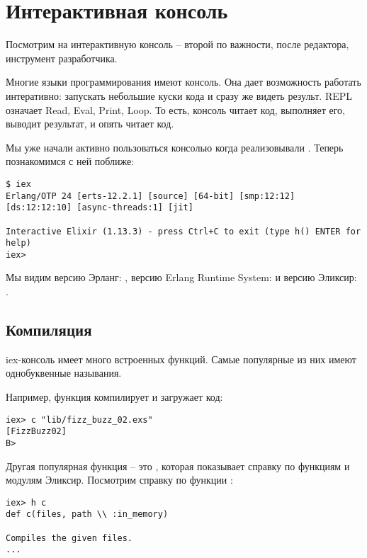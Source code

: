 \chapter{Интерактивная консоль}

Посмотрим на интерактивную консоль  -- второй по важности, после редактора, инструмент разработчика.

Многие языки программирования имеют  консоль. Она дает возможность работать интеративно: запускать небольшие куски кода и сразу же видеть результ. REPL означает Read, Eval, Print, Loop. То есть, консоль читает код, выполняет его, выводит результат, и опять читает код.

Мы уже начали активно пользоваться консолью когда реализовывали . Теперь познакомимся с ней поближе:

\begin{lstlisting}[caption=Запуск консоли, language=ElixirShell, style=elixir-shell]
$ iex
Erlang/OTP 24 [erts-12.2.1] [source] [64-bit] [smp:12:12] [ds:12:12:10] [async-threads:1] [jit]

Interactive Elixir (1.13.3) - press Ctrl+C to exit (type h() ENTER for help)
iex>
\end{lstlisting}

Мы видим версию Эрланг: , версию Erlang Runtime System:  и версию Эликсир: .

\section{Компиляция}

iex-консоль имеет много встроенных функций. Самые популярные из них имеют однобуквенные называния.

Например, функция  компилирует и загружает код:

\begin{lstlisting}[language=ElixirShell, style=elixir-shell]
iex> c "lib/fizz_buzz_02.exs"
[FizzBuzz02]
B>
\end{lstlisting}

Другая популярная функция -- это , которая показывает справку по функциям и модулям Эликсир. Посмотрим справку по функции :

\begin{lstlisting}[language=ElixirShell, style=elixir-shell]
iex> h c
def c(files, path \\ :in_memory)

Compiles the given files.
...
\end{lstlisting}

